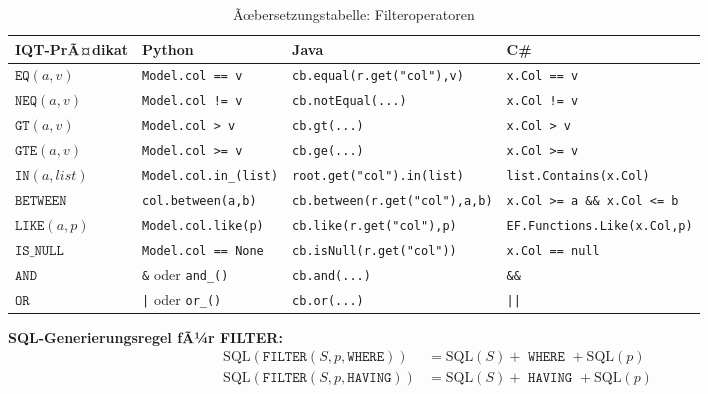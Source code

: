 \begin{table}
\centering
\caption{Ãœbersetzungstabelle: Filteroperatoren}
\label{tab:filter_ops}
\renewcommand{\arraystretch}{1.4}
\begin{tabularx}{\textwidth}{lXXX}
\toprule
\textbf{IQT-PrÃ¤dikat} & \textbf{Python} & \textbf{Java} & \textbf{C\#} \\
\midrule
$\mathtt{EQ}(a, v)$
  & \texttt{Model.col == v}
  & \texttt{cb.equal(r.get("col"),v)}
  & \texttt{x.Col == v} \\
$\mathtt{NEQ}(a, v)$
  & \texttt{Model.col != v}
  & \texttt{cb.notEqual(...)}
  & \texttt{x.Col != v} \\
$\mathtt{GT}(a, v)$
  & \texttt{Model.col > v}
  & \texttt{cb.gt(...)}
  & \texttt{x.Col > v} \\
$\mathtt{GTE}(a, v)$
  & \texttt{Model.col >= v}
  & \texttt{cb.ge(...)}
  & \texttt{x.Col >= v} \\
$\mathtt{IN}(a, list)$
  & \texttt{Model.col.in\_(list)}
  & \texttt{root.get("col").in(list)}
  & \texttt{list.Contains(x.Col)} \\
$\mathtt{BETWEEN}$
  & \texttt{col.between(a,b)}
  & \texttt{cb.between(r.get("col"),a,b)}
  & \texttt{x.Col >= a \&\& x.Col <= b} \\
$\mathtt{LIKE}(a, p)$
  & \texttt{Model.col.like(p)}
  & \texttt{cb.like(r.get("col"),p)}
  & \texttt{EF.Functions.Like(x.Col,p)} \\
$\mathtt{IS\_NULL}$
  & \texttt{Model.col == None}
  & \texttt{cb.isNull(r.get("col"))}
  & \texttt{x.Col == null} \\
$\mathtt{AND}$
  & \texttt{\&} oder \texttt{and\_()}
  & \texttt{cb.and(...)}
  & \texttt{\&\&} \\
$\mathtt{OR}$
  & \texttt{|} oder \texttt{or\_()}
  & \texttt{cb.or(...)}
  & \texttt{||} \\
\bottomrule
\end{tabularx}
\end{table}

\textbf{SQL-Generierungsregel fÃ¼r FILTER:}
\begin{align*}
\mathrm{SQL}(\mathtt{FILTER}(S, p, \mathtt{WHERE}))
  &= \mathrm{SQL}(S) + \texttt{ WHERE } + \mathrm{SQL}(p) \\
\mathrm{SQL}(\mathtt{FILTER}(S, p, \mathtt{HAVING}))
  &= \mathrm{SQL}(S) + \texttt{ HAVING } + \mathrm{SQL}(p)
\end{align*}

